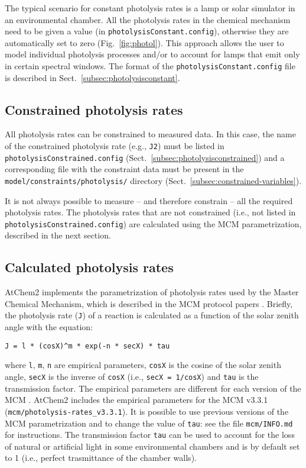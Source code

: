 The typical scenario for constant photolysis rates is a lamp or solar
simulator in an environmental chamber. All the photolysis rates
in the chemical mechanism need to be given a value (in
\texttt{photolysisConstant.config}), otherwise they are automatically
set to zero (Fig.~\ref{fig:photol}). This approach allows the user to
model individual photolysis processes and/or to account for lamps that
emit only in certain spectral windows. The format of the
\texttt{photolysisConstant.config} file is described in
Sect.~\ref{subsec:photolysisconstant}.

\subsection{Constrained photolysis rates} \label{subsec:constrained-photolysis-rates}

All photolysis rates can be constrained to measured data. In this
case, the name of the constrained photolysis rate (e.g., \texttt{J2})
must be listed in \texttt{photolysisConstrained.config}
(Sect.~\ref{subsec:photolysisconstrained}) and a corresponding file with the
constraint data must be present in the \texttt{model/constraints/photolysis/}
directory (Sect.~\ref{subsec:constrained-variables}).

It is not always possible to measure -- and therefore constrain -- all
the required photolysis rates. The photolysis rates that are not
constrained (i.e., not listed in \texttt{photolysisConstrained.config})
are calculated using the MCM parametrization, described in the next
section.

\subsection{Calculated photolysis rates} \label{subsec:calculated-photolysis-rates}

AtChem2 implements the parametrization of photolysis rates used by the
Master Chemical Mechanism, which is described in the MCM protocol
papers \citep{jenkin_1997, saunders_2003}. Briefly, the photolysis
rate (\texttt{J}) of a reaction is calculated as a function of the
solar zenith angle with the equation:

\begin{verbatim}
J = l * (cosX)^m * exp(-n * secX) * tau
\end{verbatim}

where \texttt{l}, \texttt{m}, \texttt{n} are empirical parameters,
\texttt{cosX} is the cosine of the solar zenith angle, \texttt{secX}
is the inverse of \texttt{cosX} (i.e., \texttt{secX\ =\ 1/cosX}) and
\texttt{tau} is the transmission factor. The empirical parameters are
different for each version of the MCM \citep{sommariva_2019}. AtChem2
includes the empirical parameters for the MCM v3.3.1
(\texttt{mcm/photolysis-rates\_v3.3.1}). It is possible to use
previous versions of the MCM parametrization and to change the value
of \texttt{tau}: see the file \texttt{mcm/INFO.md} for
instructions. The transmission factor \texttt{tau} can be used to
account for the loss of natural or artificial light in some
environmental chambers and is by default set to 1 (i.e., perfect
trasmittance of the chamber walls).

